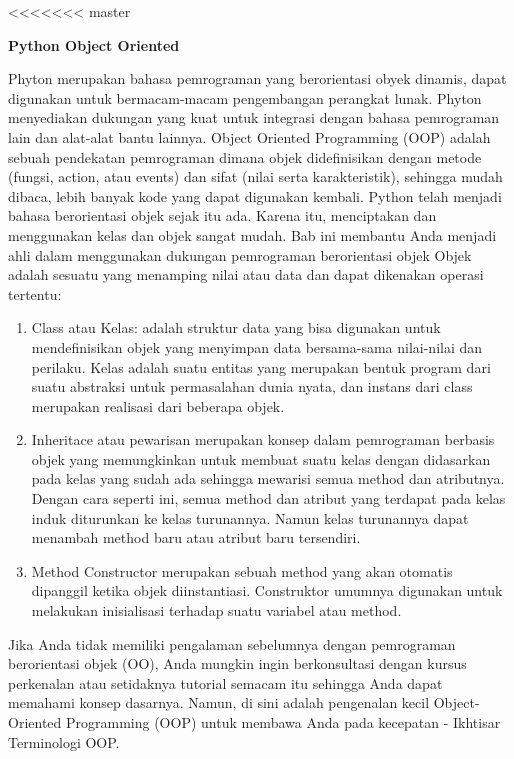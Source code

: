 <<<<<<< master
\sloppy
\begin{center}{\fontsize{16pt}{16pt}\selectfont \textbf{Python Object Oriented} \\}\end{center}
Phyton merupakan bahasa pemrograman yang berorientasi obyek dinamis, dapat digunakan untuk bermacam-macam pengembangan perangkat lunak. Phyton menyediakan dukungan yang kuat untuk integrasi dengan bahasa pemrograman lain dan alat-alat bantu lainnya.
Object Oriented Programming (OOP) adalah sebuah pendekatan pemrograman dimana objek didefinisikan dengan metode (fungsi, action, atau events) dan sifat (nilai serta karakteristik), sehingga mudah dibaca, lebih banyak kode yang dapat digunakan kembali.
Python telah menjadi bahasa berorientasi objek sejak itu ada. Karena itu, menciptakan dan menggunakan kelas dan objek sangat mudah. Bab ini membantu Anda menjadi ahli dalam menggunakan dukungan pemrograman berorientasi objek
Objek adalah sesuatu yang menamping nilai atau data dan dapat dikenakan operasi tertentu:
\begin {enumerate}
\item Class atau Kelas: adalah struktur data yang bisa digunakan untuk mendefinisikan objek yang menyimpan data bersama-sama nilai-nilai dan perilaku. Kelas adalah suatu entitas yang merupakan bentuk program dari suatu abstraksi untuk permasalahan dunia nyata, dan instans dari class merupakan realisasi dari beberapa objek.
\item Inheritace atau pewarisan merupakan konsep dalam pemrograman berbasis objek yang memungkinkan untuk membuat suatu kelas dengan didasarkan pada kelas yang sudah ada sehingga mewarisi semua method dan atributnya. Dengan cara seperti ini, semua method dan atribut yang terdapat pada kelas induk diturunkan ke kelas turunannya. Namun kelas turunannya dapat menambah method baru atau atribut baru tersendiri.
\item Method Constructor merupakan sebuah method yang akan otomatis dipanggil ketika objek diinstantiasi. Construktor umumnya digunakan untuk melakukan inisialisasi terhadap suatu variabel atau method.
\end {enumerate}

Jika Anda tidak memiliki pengalaman sebelumnya dengan pemrograman berorientasi objek (OO), Anda mungkin  ingin berkonsultasi dengan kursus perkenalan atau setidaknya tutorial semacam itu sehingga Anda dapat memahami konsep dasarnya. Namun, di sini adalah pengenalan kecil Object-Oriented Programming (OOP) untuk membawa Anda pada kecepatan - Ikhtisar Terminologi OOP.

